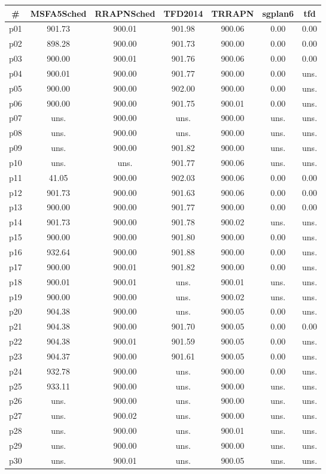 \begin{tabular}{c||c|c|c|c|c|c}
\textbf{\#} & \textbf{MSFA5Sched} & \textbf{RRAPNSched} & \textbf{TFD2014} & \textbf{TRRAPN} & \textbf{sgplan6} & \textbf{tfd}\\
\hline
\hline
p01 & 901.73 & 900.01 & 901.98 & 900.06 & 0.00 & 0.00\\
p02 & 898.28 & 900.00 & 901.73 & 900.00 & 0.00 & 0.00\\
p03 & 900.00 & 900.01 & 901.76 & 900.06 & 0.00 & 0.00\\
p04 & 900.01 & 900.00 & 901.77 & 900.00 & 0.00 & uns.\\
p05 & 900.00 & 900.00 & 902.00 & 900.00 & 0.00 & uns.\\
p06 & 900.00 & 900.00 & 901.75 & 900.01 & 0.00 & uns.\\
p07 & uns. & 900.00 & uns. & 900.00 & uns. & uns.\\
p08 & uns. & 900.00 & uns. & 900.00 & uns. & uns.\\
p09 & uns. & 900.00 & 901.82 & 900.00 & uns. & uns.\\
p10 & uns. & uns. & 901.77 & 900.06 & uns. & uns.\\
p11 & 41.05 & 900.00 & 902.03 & 900.06 & 0.00 & 0.00\\
p12 & 901.73 & 900.00 & 901.63 & 900.06 & 0.00 & 0.00\\
p13 & 900.00 & 900.00 & 901.77 & 900.00 & 0.00 & 0.00\\
p14 & 901.73 & 900.00 & 901.78 & 900.02 & uns. & uns.\\
p15 & 900.00 & 900.00 & 901.80 & 900.00 & 0.00 & uns.\\
p16 & 932.64 & 900.00 & 901.88 & 900.00 & 0.00 & uns.\\
p17 & 900.00 & 900.01 & 901.82 & 900.00 & 0.00 & uns.\\
p18 & 900.01 & 900.01 & uns. & 900.01 & uns. & uns.\\
p19 & 900.00 & 900.00 & uns. & 900.02 & uns. & uns.\\
p20 & 904.38 & 900.00 & uns. & 900.05 & 0.00 & uns.\\
p21 & 904.38 & 900.00 & 901.70 & 900.05 & 0.00 & 0.00\\
p22 & 904.38 & 900.01 & 901.59 & 900.05 & 0.00 & uns.\\
p23 & 904.37 & 900.00 & 901.61 & 900.05 & 0.00 & uns.\\
p24 & 932.78 & 900.00 & uns. & 900.00 & 0.00 & uns.\\
p25 & 933.11 & 900.00 & uns. & 900.00 & uns. & uns.\\
p26 & uns. & 900.00 & uns. & 900.00 & uns. & uns.\\
p27 & uns. & 900.02 & uns. & 900.00 & uns. & uns.\\
p28 & uns. & 900.00 & uns. & 900.01 & uns. & uns.\\
p29 & uns. & 900.00 & uns. & 900.00 & uns. & uns.\\
p30 & uns. & 900.01 & uns. & 900.05 & uns. & uns.\\
\end{tabular}

